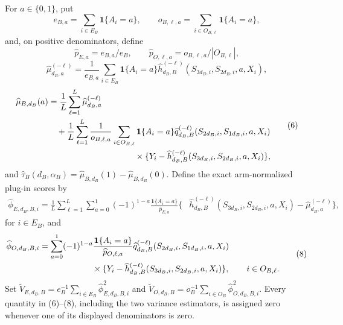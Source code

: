 For \(a\in\{0,1\}\), put
\[
 e_{B,a}=\sum_{i\in E_B}\mathbf 1\{A_i=a\},
 \qquad
 o_{B,\ell,a}=\sum_{i\in O_{B,\ell}}\mathbf 1\{A_i=a\},
\]
and, on positive denominators, define
\[
 \widehat p_{E,a}=e_{B,a}/e_B,
 \qquad
 \widehat p_{O,\ell,a}=o_{B,\ell,a}/|O_{B,\ell}|,
\]
\[
 \widehat\mu_{d_B,a}^{(-\ell)}
 =\frac1{e_{B,a}}\sum_{i\in E_B}\mathbf 1\{A_i=a\}
 \widehat h_{d_B,B}^{(-\ell)}(S_{3d_B,i},S_{2d_B,i},a,X_i),
\]
\[
\begin{aligned}
 \widehat\mu_{B,d_B}(a)
 &=\frac1L\sum_{\ell=1}^L\widehat\mu_{d_B,a}^{(-\ell)}\\
 &\quad+\frac1L\sum_{\ell=1}^L\frac1{o_{B,\ell,a}}
 \sum_{i\in O_{B,\ell}}\mathbf 1\{A_i=a\}
 \widehat q_{d_B,B}^{(-\ell)}(S_{2d_B,i},S_{1d_B,i},a,X_i)\\
 &\hspace{36mm}\times
 \{Y_i-\widehat h_{d_B,B}^{(-\ell)}(S_{3d_B,i},S_{2d_B,i},a,X_i)\},
\end{aligned} \tag{6}
\]
and \(\widehat\tau_B(d_B,\alpha_B)=\widehat\mu_{B,d_B}(1)-\widehat\mu_{B,d_B}(0)\). Define the exact arm-normalized plug-in scores by
\[
\begin{aligned}
 \widehat\phi_{E,d_B,B,i}
 =\frac1L\sum_{\ell=1}^L\sum_{a=0}^1(-1)^{1-a}
 \frac{\mathbf 1\{A_i=a\}}{\widehat p_{E,a}}
 \{&\widehat h_{d_B,B}^{(-\ell)}(S_{3d_B,i},S_{2d_B,i},a,X_i)
 -\widehat\mu_{d_B,a}^{(-\ell)}\},
\end{aligned} \tag{7}
\]
for \(i\in E_B\), and
\[
\begin{aligned}
 \widehat\phi_{O,d_B,B,i}
 &=\sum_{a=0}^1(-1)^{1-a}
 \frac{\mathbf 1\{A_i=a\}}{\widehat p_{O,\ell,a}}
 \widehat q_{d_B,B}^{(-\ell)}(S_{2d_B,i},S_{1d_B,i},a,X_i)\\
 &\hspace{22mm}\times
 \{Y_i-\widehat h_{d_B,B}^{(-\ell)}(S_{3d_B,i},S_{2d_B,i},a,X_i)\},
 \qquad i\in O_{B,\ell}.
\end{aligned} \tag{8}
\]
Set \(\widetilde V_{E,d_B,B}=e_B^{-1}\sum_{i\in E_B}\widehat\phi_{E,d_B,B,i}^2\) and \(\widetilde V_{O,d_B,B}=o_B^{-1}\sum_{i\in O_B}\widehat\phi_{O,d_B,B,i}^2\). Every quantity in (6)--(8), including the two variance estimators, is assigned zero whenever one of its displayed denominators is zero.

